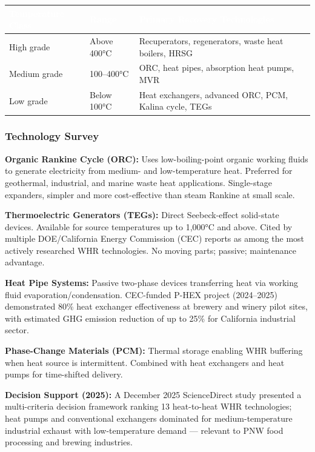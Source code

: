 \documentclass[11pt,letterpaper]{article}
\newcommand{\tableheader}[1]{\textbf{\sffamily\textcolor{white}{#1}}}
\begin{document}
\begin{center}
\begin{tabularx}{\textwidth}{L{3cm}L{3cm}X}
\toprule
{}
\tableheader{Temperature Class} & \tableheader{Range} & \tableheader{Primary Recovery Technologies} \\
\midrule
High grade & Above 400°C & Recuperators, regenerators, waste heat boilers, HRSG \\
Medium grade & 100--400°C & ORC, heat pipes, absorption heat pumps, MVR \\
Low grade & Below 100°C & Heat exchangers, advanced ORC, PCM, Kalina cycle, TEGs \\
\bottomrule
\end{tabularx}
\end{center}

\subsubsection{Technology Survey}

\textbf{Organic Rankine Cycle (ORC):} Uses low-boiling-point organic working fluids to generate electricity from medium- and low-temperature heat. Preferred for geothermal, industrial, and marine waste heat applications. Single-stage expanders, simpler and more cost-effective than steam Rankine at small scale.

\textbf{Thermoelectric Generators (TEGs):} Direct Seebeck-effect solid-state devices. Available for source temperatures up to 1,000°C and above. Cited by multiple DOE/California Energy Commission (CEC) reports as among the most actively researched WHR technologies. No moving parts; passive; maintenance advantage.

\textbf{Heat Pipe Systems:} Passive two-phase devices transferring heat via working fluid evaporation/condensation. CEC-funded P-HEX project (2024--2025) demonstrated 80\% heat exchanger effectiveness at brewery and winery pilot sites, with estimated GHG emission reduction of up to 25\% for California industrial sector.

\textbf{Phase-Change Materials (PCM):} Thermal storage enabling WHR buffering when heat source is intermittent. Combined with heat exchangers and heat pumps for time-shifted delivery.

\textbf{Decision Support (2025):} A December 2025 ScienceDirect study presented a multi-criteria decision framework ranking 13 heat-to-heat WHR technologies; heat pumps and conventional exchangers dominated for medium-temperature industrial exhaust with low-temperature demand — relevant to PNW food processing and brewing industries.
\end{document}
